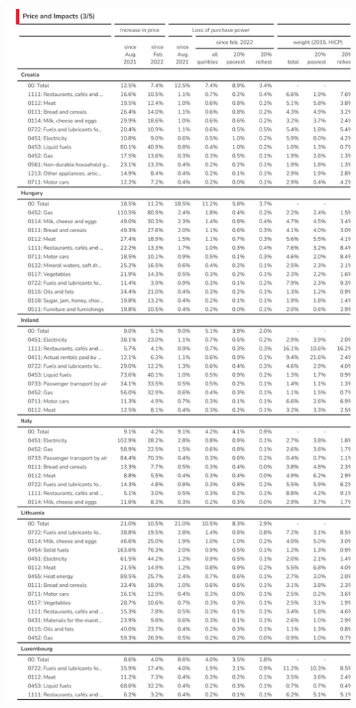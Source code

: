\documentclass[
  9pt,
  a4paper,
  numbers=noendperiod,
  DIV=12]{scrartcl}
\begin{document}
\includegraphics{../svg/annex_3.png}
\end{document}
